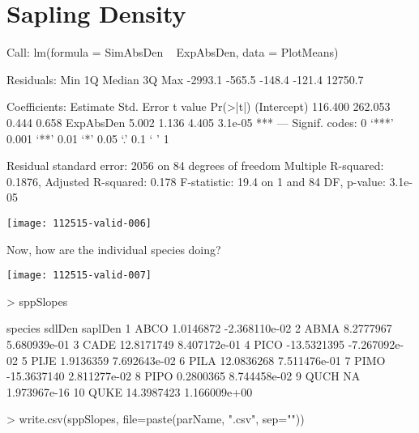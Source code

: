 \documentclass{article}
\begin{document}
\newpage

\section{Sapling Density}
\begin{Schunk}
\begin{Soutput}
Call:
lm(formula = SimAbsDen ~ ExpAbsDen, data = PlotMeans)

Residuals:
    Min      1Q  Median      3Q     Max 
-2993.1  -565.5  -148.4  -121.4 12750.7 

Coefficients:
            Estimate Std. Error t value Pr(>|t|)    
(Intercept)  116.400    262.053   0.444    0.658    
ExpAbsDen      5.002      1.136   4.405  3.1e-05 ***
---
Signif. codes:  0 ‘***’ 0.001 ‘**’ 0.01 ‘*’ 0.05 ‘.’ 0.1 ‘ ’ 1

Residual standard error: 2056 on 84 degrees of freedom
Multiple R-squared:  0.1876,	Adjusted R-squared:  0.178 
F-statistic:  19.4 on 1 and 84 DF,  p-value: 3.1e-05
\end{Soutput}
\end{Schunk}
\texttt{[image: 112515-valid-006]}

Now, how are the individual species doing?

\texttt{[image: 112515-valid-007]}
\begin{Schunk}
\begin{Sinput}
>   sppSlopes
\end{Sinput}
\begin{Soutput}
   species      sdlDen       saplDen
1     ABCO   1.0146872 -2.368110e-02
2     ABMA   8.2777967  5.680939e-01
3     CADE  12.8171749  8.407172e-01
4     PICO -13.5321395 -7.267092e-02
5     PIJE   1.9136359  7.692643e-02
6     PILA  12.0836268  7.511476e-01
7     PIMO -15.3637140  2.811277e-02
8     PIPO   0.2800365  8.744458e-02
9     QUCH          NA  1.973967e-16
10    QUKE  14.3987423  1.166009e+00
\end{Soutput}
\begin{Sinput}
>     write.csv(sppSlopes, file=paste(parName, ".csv", sep=""))
\end{Sinput}
\end{Schunk}


\newpage
\end{document}
